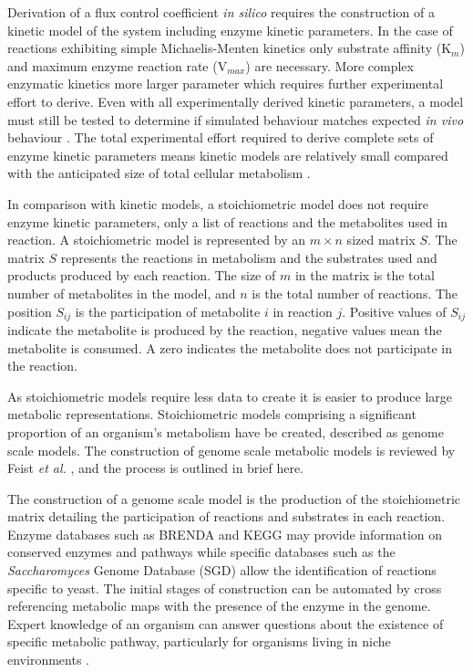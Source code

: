 Derivation of a flux control coefficient \emph{in silico} requires the construction of a kinetic model of the system including enzyme kinetic parameters. In the case of reactions exhibiting simple Michaelis-Menten kinetics only substrate affinity (K$_{m}$) and maximum enzyme reaction rate (V$_{max}$) are necessary. More complex enzymatic kinetics more larger parameter which requires further experimental effort to derive. Even with all experimentally derived kinetic parameters, a model must still be tested to determine if simulated behaviour matches expected \emph{in vivo} behaviour \cite{teusink2000}. The total experimental effort required to derive complete sets of enzyme kinetic parameters means kinetic models are relatively small compared with the anticipated size of total cellular metabolism \cite{steuer2007}.


In comparison with kinetic models, a stoichiometric model does not require enzyme kinetic parameters, only a list of reactions and the metabolites used in reaction. A stoichiometric model is represented by an $m \times n$ sized matrix $S$. The matrix $S$ represents the reactions in metabolism and the substrates used and products produced by each reaction. The size of $m$ in the matrix is the total number of metabolites in the model, and $n$ is the total number of reactions. The position $S_{ij}$ is the participation of metabolite $i$ in reaction $j$. Positive values of $S_{ij}$ indicate the metabolite is produced by the reaction, negative values mean the metabolite is consumed. A zero indicates the metabolite does not participate in the reaction.

As stoichiometric models require less data to create it is easier to produce large metabolic representations. Stoichiometric models comprising a significant proportion of an organism's metabolism have be created, described as genome scale models. The construction of genome scale metabolic models is reviewed by Feist \emph{et al.} \cite{feist2009}, and the process is outlined in brief here.

The construction of a genome scale model is the production of the stoichiometric matrix detailing the participation of reactions and substrates in each reaction. Enzyme databases such as BRENDA \cite{chang2009} and KEGG \cite{okuda2008} may provide information on conserved enzymes and pathways while specific databases such as the \emph{Saccharomyces} Genome Database (SGD) \cite{cherry1997} allow the identification of reactions specific to yeast. The initial stages of construction can be automated by cross referencing metabolic maps with the presence of the enzyme in the genome. Expert knowledge of an organism can answer questions about the existence of specific metabolic pathway, particularly for organisms living in niche environments \cite{sun2009}.


